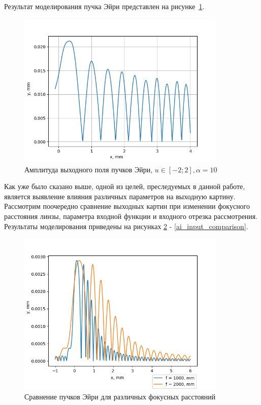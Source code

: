 {    Результат моделирования пучка Эйри представлен на рисунке~\ref{airyoutput}.
    \begin{figure}[H]
        \begin{center}
            \includegraphics[width=10cm]{plots/airyoutput}
            \caption{Амплитуда выходного поля пучков Эйри, $u \in [-2; 2],  \alpha  = 10$}
            \label{airyoutput}
        \end{center}

    \end{figure}

    Как уже было сказано выше, одной из целей, преследуемых в данной работе,
    является выявление влияния различных параметров на выходную картину.
    Рассмотрим поочередно сравнение выходных картин при изменении фокусного расстояния линзы,
    параметра входной функции и входного отрезка рассмотрения. Результаты моделирования приведены на рисунках \ref{ai_focus_comparison} - \ref{ai_input_comparison}.

    \begin{figure}[H]
        \begin{center}
            \includegraphics[width=10cm]{plots/ai_focus_comparison}
            \caption{Сравнение пучков Эйри для различных фокусных расстояний}
            \label{ai_focus_comparison}
        \end{center}
    \end{figure}

}
